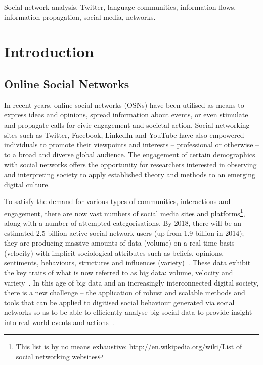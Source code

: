 \documentclass[conference]{IEEEtran}
\begin{document}
%

\begin{IEEEkeywords}
Social network analysis, Twitter, language communities, information
flows, information propagation, social media, networks.
\end{IEEEkeywords}


\section{Introduction}\label{intro}

\subsection{Online Social Networks}
 
In recent years, online social networks (OSNs) have been utilised as
means to express ideas and opinions, spread information about events,
or even stimulate and propagate calls for civic engagement and
societal action. Social networking sites such as Twitter, Facebook,
LinkedIn and YouTube have also empowered individuals to promote their
viewpoints and interests -- professional or otherwise -- to a broad
and diverse global audience. The engagement of certain demographics
with social networks offers the opportunity for researchers interested
in observing and interpreting society to apply established theory and
methods to an emerging digital culture.

To satisfy the demand for various types of communities, interactions
and engagement, there are now vast numbers of social media sites and
platforms\footnote{This list is by no means exhaustive:
\url{http://en.wikipedia.org/wiki/List of social networking
websites}}, along with a number of attempted categorisations. By 2018,
there will be an estimated 2.5 billion active social network users (up
from 1.9 billion in 2014); they are producing massive amounts of data
(volume) on a real-time basis (velocity) with implicit sociological
attributes such as beliefs, opinions, sentiments, behaviours,
structures and influences (variety)~\cite{burnap-et-al:2015}. These
data exhibit the key traits of what is now referred to as big data:
volume, velocity and variety~\cite{postsm:2014}. In this age of big
data and an increasingly interconnected digital society, there is a
new challenge -- the application of robust and scalable methods and
tools that can be applied to digitised social behaviour generated via
social networks so as to be able to efficiently analyse big social
data to provide insight into real-world events and
actions~\cite{lazer-et-al:2009,burnap-et-al:2015}.
\end{document}
